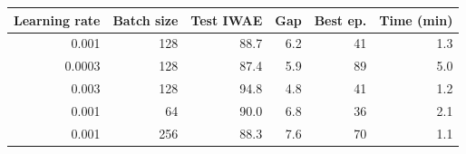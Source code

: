 \begin{tabular}{rrrrrr}
\toprule
Learning rate & Batch size & Test IWAE & Gap & Best ep. & Time (min) \\
\midrule
0.001 & 128 & 88.7 & 6.2 & 41 & 1.3 \\
0.0003 & 128 & 87.4 & 5.9 & 89 & 5.0 \\
0.003 & 128 & 94.8 & 4.8 & 41 & 1.2 \\
0.001 & 64 & 90.0 & 6.8 & 36 & 2.1 \\
0.001 & 256 & 88.3 & 7.6 & 70 & 1.1 \\
\bottomrule
\end{tabular}
